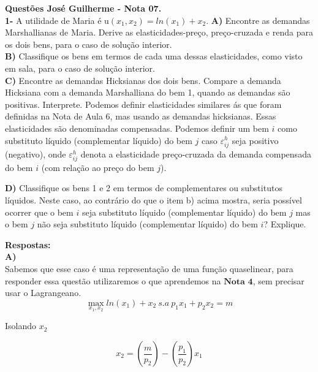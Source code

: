 \documentclass[a4paper, 12pt]{article} %
\begin{document}
\begin{flushleft}
\textbf{Questões José Guilherme - Nota 07.}
\\
\textbf{1- } A utilidade de Maria é u$(x_{1},x_{2}) = ln(x_{1}) + x_{2}$.
\singlespacing
\textbf{A)} Encontre as demandas Marshallianas de Maria. Derive as elasticidades-preço, preço-cruzada e renda para os dois bens, para o caso de solução interior.
\\
\textbf{B)} Classifique os bens em termos de cada uma dessas elasticidades, como visto em sala, para o caso de solução interior.
\\
\textbf{C)} Encontre as demandas Hicksianas dos dois bens. Compare a demanda Hicksiana com a demanda Marshalliana do bem 1, quando as demandas são positivas. Interprete.
\singlespacing
Podemos definir elasticidades similares ás que foram definidas na Nota de Aula 6, mas usando as demandas hicksianas. Essas elasticidades são denominadas compensadas. Podemos definir um bem $\textit{i}$ como substituto líquido (complementar líquido) do bem $\textit{j}$ caso $\varepsilon _{ij}^{h}$ seja positivo
(negativo), onde  $\varepsilon _{ij}^{h}$ denota a elasticidade preço-cruzada da demanda compensada do bem $\textit{i}$ (com relação ao preço do bem $\textit{j}$).
\singlespacing

\textbf{D)} Classifique os bens 1 e 2 em termos de complementares ou substitutos líquidos. Neste caso, ao contrário do que o item b) acima mostra, seria possível ocorrer que o bem $\textit{i}$ seja substituto líquido (complementar líquido) do bem $\textit{j}$ mas o bem $\textit{j}$ não seja substituto
líquido (complementar líquido) do bem $\textit{i}$? Explique.

\singlespacing

\textbf{Respostas:} 
\\
\textbf{A)} 
\\
Sabemos que esse caso é uma representação de uma função quaselinear, para responder essa questão utilizaremos o que aprendemos na $\textbf{Nota 4}$, sem precisar usar o Lagrangeano.
\\

\begin{equation}
\max_{x_{1},x_{2}} ln(x_{1}) + x_{2} \   s.a     \ p_{1}x_{1} + p_{2}x_{2} = m
\end{equation}
\begin{center}

Isolando $x_{2}$
\end{center}

\begin{equation}
x_{2} = \left( \dfrac{m}{p_{2}} \right) - \left( \dfrac{p_{1}}{p_{2}}\right) x_{1} 
\end{equation}


\end{flushleft}
\end{document}

